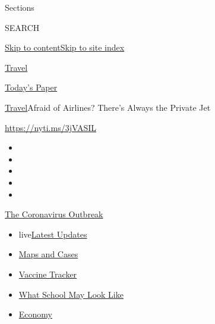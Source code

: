 Sections

SEARCH

\protect\hyperlink{site-content}{Skip to
content}\protect\hyperlink{site-index}{Skip to site index}

\href{https://www.nytimes3xbfgragh.onion/section/travel}{Travel}

\href{https://myaccount.nytimes3xbfgragh.onion/auth/login?response_type=cookie\&client_id=vi}{}

\href{https://www.nytimes3xbfgragh.onion/section/todayspaper}{Today's
Paper}

\href{/section/travel}{Travel}\textbar{}Afraid of Airlines? There's
Always the Private Jet

\url{https://nyti.ms/3jVASIL}

\begin{itemize}
\item
\item
\item
\item
\item
\end{itemize}

\href{https://www.nytimes3xbfgragh.onion/news-event/coronavirus?action=click\&pgtype=Article\&state=default\&region=TOP_BANNER\&context=storylines_menu}{The
Coronavirus Outbreak}

\begin{itemize}
\tightlist
\item
  live\href{https://www.nytimes3xbfgragh.onion/2020/08/01/world/coronavirus-covid-19.html?action=click\&pgtype=Article\&state=default\&region=TOP_BANNER\&context=storylines_menu}{Latest
  Updates}
\item
  \href{https://www.nytimes3xbfgragh.onion/interactive/2020/us/coronavirus-us-cases.html?action=click\&pgtype=Article\&state=default\&region=TOP_BANNER\&context=storylines_menu}{Maps
  and Cases}
\item
  \href{https://www.nytimes3xbfgragh.onion/interactive/2020/science/coronavirus-vaccine-tracker.html?action=click\&pgtype=Article\&state=default\&region=TOP_BANNER\&context=storylines_menu}{Vaccine
  Tracker}
\item
  \href{https://www.nytimes3xbfgragh.onion/interactive/2020/07/29/us/schools-reopening-coronavirus.html?action=click\&pgtype=Article\&state=default\&region=TOP_BANNER\&context=storylines_menu}{What
  School May Look Like}
\item
  \href{https://www.nytimes3xbfgragh.onion/live/2020/07/31/business/stock-market-today-coronavirus?action=click\&pgtype=Article\&state=default\&region=TOP_BANNER\&context=storylines_menu}{Economy}
\end{itemize}

